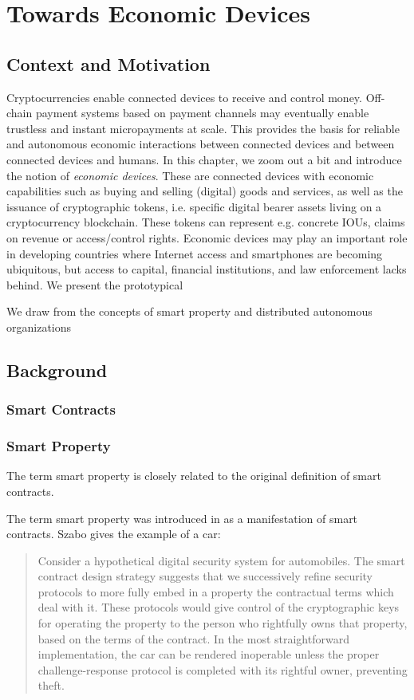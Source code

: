 \chapter{Towards Economic Devices}
\label{sec:economicobjects}

\section{Context and Motivation}

Cryptocurrencies enable connected devices to receive and control money. Off-chain payment systems based on payment channels may eventually enable trustless and instant micropayments at scale. This provides the basis for reliable and autonomous economic interactions between connected devices and between connected devices and humans. In this chapter, we zoom out a bit and introduce the notion of \emph{economic devices}. These are connected devices with economic capabilities such as buying and selling (digital) goods and services, as well as the issuance of cryptographic tokens, i.e. specific digital bearer assets living on a cryptocurrency blockchain. These tokens can represent e.g. concrete IOUs, claims on revenue or access/control rights. Economic devices may play an important role in developing countries where Internet access and smartphones are becoming ubiquitous, but access to capital, financial institutions, and law enforcement lacks behind. We present the prototypical 

We draw from the concepts of smart property and distributed autonomous organizations 


\section{Background}

\subsection{Smart Contracts}

\subsection{Smart Property}

The term smart property is closely related to the original definition of smart contracts. 

The term smart property was introduced in \cite{szabo1997} as a manifestation of smart contracts. Szabo gives the example of a car:
\begin{quote}
Consider a hypothetical digital security system for automobiles. The smart contract design strategy suggests that we successively refine security protocols to more fully embed in a property the contractual terms which deal with it. These protocols would give control of the cryptographic keys for operating the property to the person who rightfully owns that property, based on the terms of the contract. In the most straightforward implementation, the car can be rendered inoperable unless the proper challenge-response protocol is completed with its rightful owner, preventing theft.
\end{quote}

